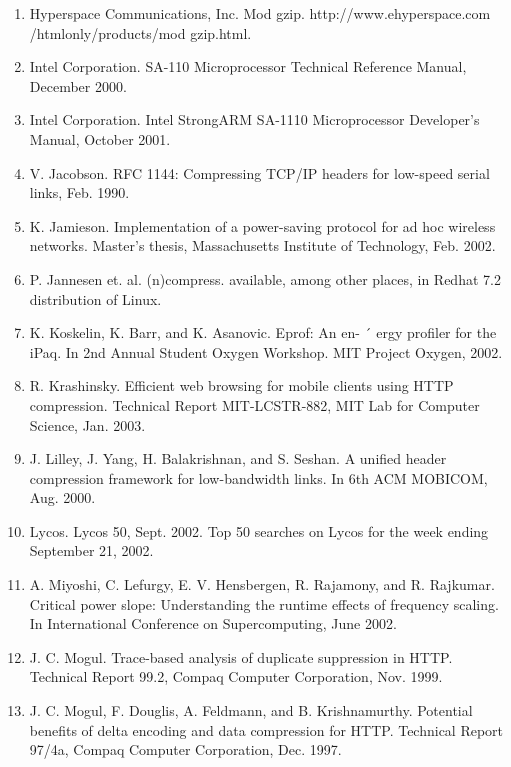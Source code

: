 \documentclass{article}
\begin{document}
\begin{enumerate}
	\item Hyperspace Communications, Inc.
	Mod gzip. http://www.ehyperspace.com /htmlonly/products/mod gzip.html.

	\item Intel Corporation. SA-110 Microprocessor Technical Reference Manual, December 2000.


	\item Intel Corporation. Intel StrongARM SA-1110 Microprocessor Developer’s Manual, October 2001.

	\item V. Jacobson. RFC 1144: Compressing TCP/IP headers
	for low-speed serial links, Feb. 1990.

	\item K. Jamieson. Implementation of a power-saving protocol for ad hoc wireless networks. Master’s thesis, Massachusetts Institute of Technology, Feb. 2002.

	\item P. Jannesen et. al. (n)compress. available, among other
	places, in Redhat 7.2 distribution of Linux.

	\item K. Koskelin, K. Barr, and K. Asanovic. Eprof: An en- ´
	ergy profiler for the iPaq. In 2nd Annual Student Oxygen
	Workshop. MIT Project Oxygen, 2002.

	\item R. Krashinsky. Efficient web browsing for mobile clients
	using HTTP compression. Technical Report MIT-LCSTR-882, MIT Lab for Computer Science, Jan. 2003.

	\item J. Lilley, J. Yang, H. Balakrishnan, and S. Seshan. A unified header compression framework for low-bandwidth
	links. In 6th ACM MOBICOM, Aug. 2000.

	\item Lycos. Lycos 50, Sept. 2002. Top 50 searches on Lycos
	for the week ending September 21, 2002.

	\item A. Miyoshi, C. Lefurgy, E. V. Hensbergen, R. Rajamony,
	and R. Rajkumar. Critical power slope: Understanding
	the runtime effects of frequency scaling. In International
	Conference on Supercomputing, June 2002.

	\item J. C. Mogul. Trace-based analysis of duplicate suppression in HTTP. Technical Report 99.2, Compaq Computer
	Corporation, Nov. 1999.

	\item J. C. Mogul, F. Douglis, A. Feldmann, and B. Krishnamurthy. Potential benefits of delta encoding and data
	compression for HTTP. Technical Report 97/4a, Compaq Computer Corporation, Dec. 1997.


\end{enumerate}
\end{document}
